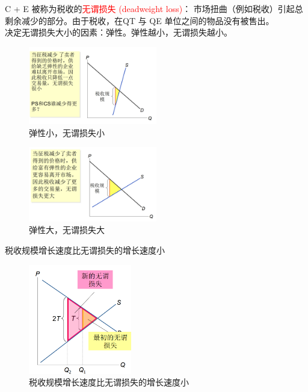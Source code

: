 \documentclass[12pt,a4paper]{article}
\begin{document}
C + E 被称为税收的\textcolor{red}{无谓损失 (deadweight loss)}： 市场扭曲（例如税收）引起总剩余减少的部分。由于税收，在QT 与 QE 单位之间的物品没有被售出。\\

决定无谓损失大小的因素：弹性。弹性越小，无谓损失越小。\\

\begin{figure}[H] 
  \centering %
  \includegraphics[width=0.5\textwidth]{弹性小，无谓损失小.png} 
  \caption{弹性小，无谓损失小} %
\end{figure}
\begin{figure}[H] 
  \centering %
  \includegraphics[width=0.5\textwidth]{弹性大，无谓损失大.png} 
  \caption{弹性大，无谓损失大} %
\end{figure}

税收规模增长速度比无谓损失的增长速度小
\begin{figure}[H] 
  \centering %
  \includegraphics[width=0.4\textwidth]{税收规模与无谓损失.png} 
  \caption{税收规模增长速度比无谓损失的增长速度小} %
\end{figure}
\end{document}
